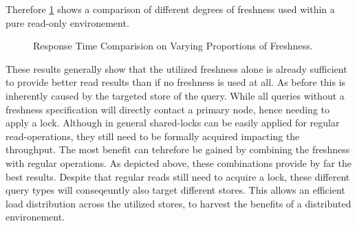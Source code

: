 Therefore \ref{fig:fresh0} shows a comparison of different degrees of freshness used within a pure read-only environement.
\begin{figure}[t] 
    \centering 
    \caption{Response Time Comparision on Varying Proportions of Freshness.}
    \label{fig:fresh0}
\end{figure}




These results generally show that the utilized freshness alone is already sufficient to provide better read results than if no freshness is used at all.
As before this is inherently caused by the targeted store of the query. While all queries without a freshness specification will directly contact a primary node,
hence needing to apply a lock. Although in general shared-locks can be easily applied for regular read-operations, they still need to be formally acquired impacting
the throughput. The most benefit can tehrefore be gained by combining the freshness with regular operations. As depicted above, these combinations provide by far 
the best results. Despite that regular reads still need to acquire a lock, these different query types will conseqeuntly also target different stores. 
This allows an efficient load distribution across the utilized stores, to harvest the benefits of a distributed environement.\\


